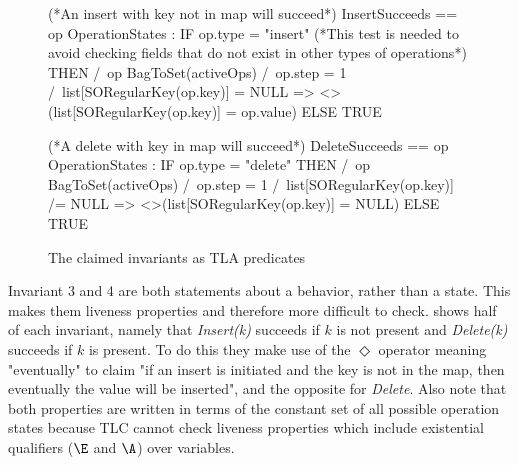 \documentclass{uit-thesis}
\begin{document}
\begin{figure}[h]
    \begin{tla}
(*An insert with key not in map will succeed*)
InsertSucceeds ==
    \A op \in OperationStates :
        IF op.type = "insert"
        (*This test is needed to avoid checking fields that do not exist in other types of operations*)
        THEN
            /\ op \in BagToSet(activeOps)
            /\ op.step = 1
            /\ list[SORegularKey(op.key)] = NULL
            => <>(list[SORegularKey(op.key)] = op.value)
        ELSE TRUE

(*A delete with key in map will succeed*)
DeleteSucceeds ==
    \A op \in OperationStates :
        IF op.type = "delete"
        THEN
            /\ op \in BagToSet(activeOps)
            /\ op.step = 1
            /\ list[SORegularKey(op.key)] /= NULL
        => <>(list[SORegularKey(op.key)] = NULL)
        ELSE TRUE
        
    \end{tla}
\begin{tlatex}
\@x{}%
%
\@xx{}%
%
%
%
%
%
\@xx{}%
%
%
%
%
%
\@pvspace{8.0pt}%
\@x{}%
%
\@xx{}%
%
%
%
%
%
%
%
%
\@pvspace{8.0pt}%
\end{tlatex}
    \caption{The claimed invariants as TLA predicates}
    \label{fig:invariants}
\end{figure}
Invariant 3 and 4 are both statements about a behavior, rather than a state. This makes them liveness properties and therefore more difficult to check.  shows half of each invariant, namely that \textit{Insert(k)} succeeds if $k$ is not present and \textit{Delete(k)} succeeds if $k$ is present. To do this they make use of the $\Diamond$ operator meaning "eventually" to claim "if an insert is initiated and the key is not in the map, then eventually the value will be inserted", and the opposite for \textit{Delete}. Also note that both properties are written in terms of the constant set of all possible operation states because TLC cannot check liveness properties which include existential qualifiers ($\E$ and $\A$) over variables.\\\\
\end{document}
